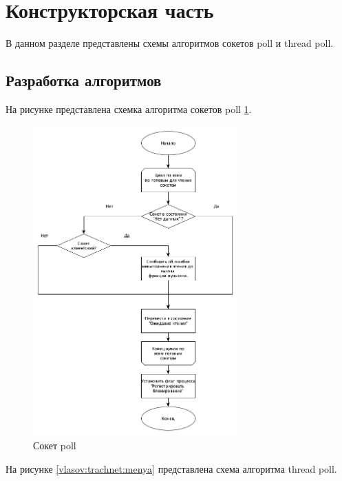 \section{\large Конструкторская часть}

В данном разделе представлены схемы алгоритмов сокетов poll и thread poll.

\subsection{Разработка алгоритмов}

На рисунке представлена схемка алгоритма сокетов poll \ref{vlasov:naydet:menya}.

\begin{figure}[ht!]
	\centering
		\includegraphics[width=0.7\textwidth]{assets/graphs/poll.png}
		\caption{Сокет poll}
		\label{vlasov:naydet:menya}
\end{figure}

На рисунке \ref{vlasov:trachnet:menya} представлена схема алгоритма thread poll.

